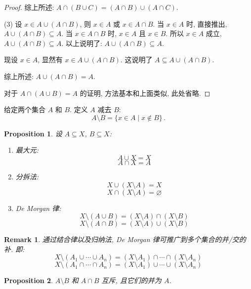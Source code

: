 \documentclass[UTF8]{ctexart}
\theoremstyle{mystyle}
\newtheorem{proposition}{Proposition}[section]
\theoremstyle{myremark}
\newtheorem*{remark}{Remark}
\theoremstyle{plain}
\begin{document}
\begin{proof}
    综上所述: $ A \cap (B \cup C) = (A \cap B) \cup (A \cap C) $.

    (3) 设 $ x \in A \cup (A \cap B) $, 则 $ x \in A $ 或 $ x \in A \cap B $. 当 $ x \in A $ 时, 直接推出, $ A \cup (A \cap B) \subseteq A $. 当 $ x \in A \cap B $ 时, $ x \in A $ 且 $ x \in B $. 所以 $ x \in A $ 成立, $ A \cup (A \cap B) \subseteq A $. 以上说明了: $ A \cup (A \cap B) \subseteq A $. 

    现设 $ x \in A $, 显然有 $ x \in A \cup (A \cap B) $. 这说明了 $ A \subseteq A \cup (A \cap B) $.

    综上所述: $ A \cup (A \cap B) = A $.

    对于 $ A \cap (A \cup B) = A $ 的证明, 方法基本和上面类似, 此处省略.
\end{proof}

\begin{definition}[\text{差}]
    给定两个集合 $ A $ 和 $ B $. 定义 $ A $ 减去 $ B $:
    \[ A \setminus B = \{x \in A \mid x \not\in B\} \,.\]
\end{definition}

\begin{proposition}
    设 $ A \subseteq X $, $ B \subseteq X $: 
    \begin{enumerate}
        \item 最大元: \[ A \cup X = X \] \[ A \cap X = A \]
        \item 分拆法: \[ X \cup (X \setminus A) = X \] \[ X \cap (X \setminus A) = \varnothing \]
        \item De Morgan 律: \[ X \setminus (A \cup B) = (X \setminus A) \cap (X \setminus B) \] \[ X \setminus (A \cap B) = (X \setminus A) \cup (X \setminus B) \]
    \end{enumerate}
\end{proposition}

\begin{remark}
    通过结合律以及归纳法, De Morgan 律可推广到多个集合的并/交的补. 即: \[ X \setminus (A_1 \cup \cdots \cup A_n) = (X \setminus A_1) \cap \cdots \cap (X \setminus A_n) \] \[ X \setminus (A_1 \cap \cdots \cap A_n) = (X \setminus A_1) \cup \cdots \cup (X \setminus A_n) \]
\end{remark} 
    
\begin{proposition} \label{1.9}
    $ A \setminus B $ 和 $ A \cap B $ 互斥, 且它们的并为 $ A $.
\end{proposition}
\end{document}
